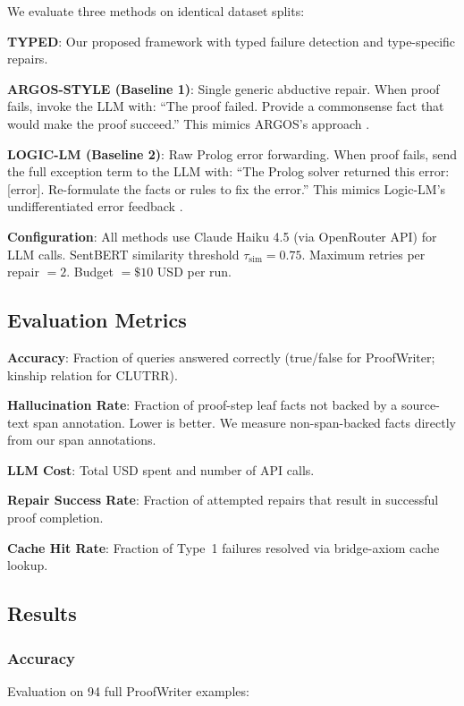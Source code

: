\documentclass[11pt,letterpaper]{article}
\begin{document}
We evaluate three methods on identical dataset splits:

\textbf{TYPED}: Our proposed framework with typed failure detection and type-specific repairs.

\textbf{ARGOS-STYLE (Baseline 1)}: Single generic abductive repair. When proof fails, invoke the LLM with: ``The proof failed. Provide a commonsense fact that would make the proof succeed.'' This mimics ARGOS's approach \citep{Cotnareanu2026}.

\textbf{LOGIC-LM (Baseline 2)}: Raw Prolog error forwarding. When proof fails, send the full exception term to the LLM with: ``The Prolog solver returned this error: [error]. Re-formulate the facts or rules to fix the error.'' This mimics Logic-LM's undifferentiated error feedback \citep{Pan2023}.

\textbf{Configuration}: All methods use Claude Haiku 4.5 (via OpenRouter API) for LLM calls. SentBERT similarity threshold $\tau_{\text{sim}} = 0.75$. Maximum retries per repair $= 2$. Budget $= \$10$ USD per run.

\subsection{Evaluation Metrics}

\textbf{Accuracy}: Fraction of queries answered correctly (true/false for ProofWriter; kinship relation for CLUTRR).

\textbf{Hallucination Rate}: Fraction of proof-step leaf facts not backed by a source-text span annotation. Lower is better. We measure non-span-backed facts directly from our span annotations.

\textbf{LLM Cost}: Total USD spent and number of API calls.

\textbf{Repair Success Rate}: Fraction of attempted repairs that result in successful proof completion.

\textbf{Cache Hit Rate}: Fraction of Type~1 failures resolved via bridge-axiom cache lookup.

\subsection{Results}

\subsubsection{Accuracy}

Evaluation on 94 full ProofWriter examples:
\end{document}
